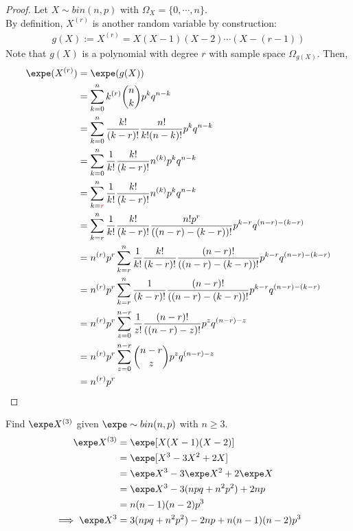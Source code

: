 \documentclass{article}
\begin{document}
	\begin{proof}
		Let $X \sim bin(n, p)$ with $\Omega_X = \{0, \cdots, n\}$. \\
		By definition, $X^{(r)}$ is another random variable by construction:
		\begin{align}
			g(X) := X^{(r)} = X(X-1)(X-2)\cdots(X-(r-1))
		\end{align}
		Note that $g(X)$ is a polynomial with degree $r$ with sample space $\Omega_{g(X)}$. Then,
		\begin{align}
			\expe (X^{(r)}) &= \expe (g(X)) \\
			&= \sum_{k=0}^n k^{(r)} \binom{n}{k} p^k q^{n-k} \\
			&= \sum_{k=0}^n \frac{k!}{(k-r)!} \frac{n!}{k!(n-k)!} p^k q^{n-k} \\
			&= \sum_{k=0}^n \frac{1}{k!}\frac{k!}{(k-r)!} n^{(k)} p^k q^{n-k} \\
			&= \sum_{k=\red{r}}^n \frac{1}{k!}\frac{k!}{(k-r)!} n^{(k)} p^k q^{n-k} \\
			&= \sum_{k=r}^n \frac{1}{k!}\frac{k!}{(k-r)!} \frac{n! p^r}{((n-r) - (k-r))!} p^{k-r} q^{(n-r)-(k-r)}\\
			&= n^{(r)} p^r \sum_{k=r}^n \frac{1}{k!}\frac{k!}{(k-r)!} \frac{(n-r)!}{((n-r) - (k-r))!} p^{k-r} q^{(n-r)-(k-r)}\\
			&= n^{(r)} p^r \sum_{k=r}^n \frac{1}{(k-r)!} \frac{(n-r)!}{((n-r) - (k-r))!} p^{k-r} q^{(n-r)-(k-r)}\\
			&= n^{(r)} p^r \sum_{z=0}^{n-r} \frac{1}{z!} \frac{(n-r)!}{((n-r) - z)!} p^z q^{(n-r)-z}\\
			&= n^{(r)} p^r \sum_{z=0}^{n-r}\binom{n-r}{z} p^z q^{(n-r)-z}\\
			&= n^{(r)} p^r
		\end{align}
	\end{proof}
   	
   	\begin{example}
   		Find $\expe X^{(3)}$ given $\expe \sim bin(n, p)$ with $n \geq 3$.
   		\begin{align}
   			\expe X^{(3)} &= \expe[X(X-1)(X-2)] \\
   			&= \expe [X^3 - 3X^2 + 2X] \\
   			&= \expe X^3 - 3 \expe X^2 + 2 \expe X \\
   			&= \expe X^3 - 3 (npq + n^2 p^2) + 2 np \\
   			&= n(n-1)(n-2) p^3 \\
   			\implies \expe X^3 &= 3 (npq + n^2 p^2) - 2 np + n(n-1)(n-2) p^3
   		\end{align}
   	\end{example}
   	
\end{document}
